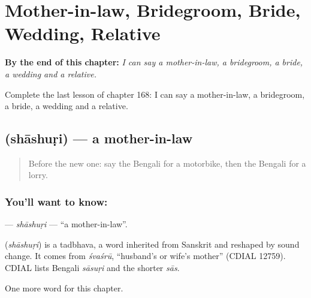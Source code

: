
\chapter{Mother-in-law, Bridegroom, Bride, Wedding, Relative}
\label{ch:bn-mother-in-law-bridegroom-bride-wedding-relative}

\begin{chapteropening}
\textbf{By the end of this chapter:} \emph{I can say a mother-in-law, a bridegroom, a bride, a wedding and a relative.}

Complete the last lesson of chapter 168: I can say a mother-in-law, a bridegroom, a bride, a wedding and a relative.
\end{chapteropening}

\section[\texorpdfstring{\bn{শাশুড়ি} (shāshuṛi)}{শাশুড়ি (shāshuṛi)}]{ (shāshuṛi) — a mother-in-law}

\label{lesson:BN-C168-shashuri}



\begin{quote}
Before the new one: say the Bengali for a motorbike, then the Bengali for a lorry.
\end{quote}

\subsection*{You'll want to know: }
\textbf{} — \emph{shāshuṛi} — \textquotedblleft{}a mother-in-law\textquotedblright{}.

\begin{cousinweb}
\textbf{} (\emph{shāshuṛi}) is a tadbhava, a word inherited from Sanskrit and reshaped by sound change. It comes from \emph{śvaśrū}, \textquotedblleft{}husband's or wife's mother\textquotedblright{} (CDIAL 12759). CDIAL lists Bengali \emph{sāsuṛi} and the shorter \emph{sās}.
\end{cousinweb}

\begin{grammarlens}[title={What you've built}]
One more word for this chapter.
\end{grammarlens}

